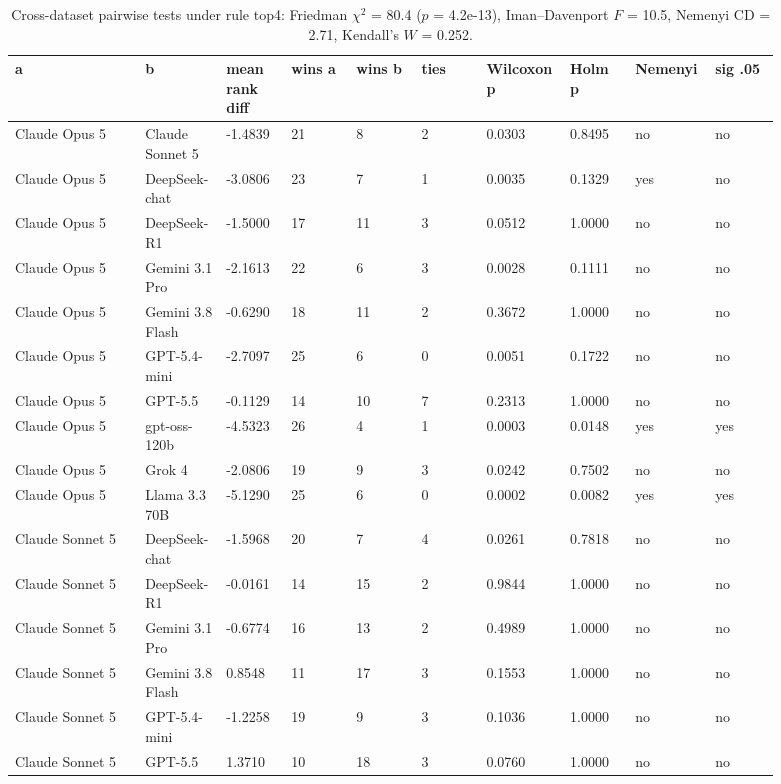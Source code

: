 \begin{landscape}
\tiny
\setlength{\tabcolsep}{3pt}
\begin{longtable}{p{0.162\linewidth}p{0.081\linewidth}p{0.081\linewidth}p{0.081\linewidth}p{0.081\linewidth}p{0.081\linewidth}p{0.081\linewidth}p{0.081\linewidth}p{0.081\linewidth}p{0.081\linewidth}}
\caption{Cross-dataset pairwise tests under rule top4: Friedman $\chi^2$ = 80.4 ($p$ = 4.2e-13), Iman--Davenport $F$ = 10.5, Nemenyi CD = 2.71, Kendall's $W$ = 0.252.}\label{tab:pairwise_top4}\\
\toprule
a & b & mean rank diff & wins a & wins b & ties & Wilcoxon p & Holm p & Nemenyi & sig .05 \\
\midrule
Claude Opus 5 & Claude Sonnet 5 & -1.4839 & 21 & 8 & 2 & 0.0303 & 0.8495 & no & no \\
Claude Opus 5 & DeepSeek-chat & -3.0806 & 23 & 7 & 1 & 0.0035 & 0.1329 & yes & no \\
Claude Opus 5 & DeepSeek-R1 & -1.5000 & 17 & 11 & 3 & 0.0512 & 1.0000 & no & no \\
Claude Opus 5 & Gemini 3.1 Pro & -2.1613 & 22 & 6 & 3 & 0.0028 & 0.1111 & no & no \\
Claude Opus 5 & Gemini 3.8 Flash & -0.6290 & 18 & 11 & 2 & 0.3672 & 1.0000 & no & no \\
Claude Opus 5 & GPT-5.4-mini & -2.7097 & 25 & 6 & 0 & 0.0051 & 0.1722 & no & no \\
Claude Opus 5 & GPT-5.5 & -0.1129 & 14 & 10 & 7 & 0.2313 & 1.0000 & no & no \\
Claude Opus 5 & gpt-oss-120b & -4.5323 & 26 & 4 & 1 & 0.0003 & 0.0148 & yes & yes \\
Claude Opus 5 & Grok 4 & -2.0806 & 19 & 9 & 3 & 0.0242 & 0.7502 & no & no \\
Claude Opus 5 & Llama 3.3 70B & -5.1290 & 25 & 6 & 0 & 0.0002 & 0.0082 & yes & yes \\
Claude Sonnet 5 & DeepSeek-chat & -1.5968 & 20 & 7 & 4 & 0.0261 & 0.7818 & no & no \\
Claude Sonnet 5 & DeepSeek-R1 & -0.0161 & 14 & 15 & 2 & 0.9844 & 1.0000 & no & no \\
Claude Sonnet 5 & Gemini 3.1 Pro & -0.6774 & 16 & 13 & 2 & 0.4989 & 1.0000 & no & no \\
Claude Sonnet 5 & Gemini 3.8 Flash & 0.8548 & 11 & 17 & 3 & 0.1553 & 1.0000 & no & no \\
Claude Sonnet 5 & GPT-5.4-mini & -1.2258 & 19 & 9 & 3 & 0.1036 & 1.0000 & no & no \\
Claude Sonnet 5 & GPT-5.5 & 1.3710 & 10 & 18 & 3 & 0.0760 & 1.0000 & no & no \\

\end{longtable}
\end{landscape}
